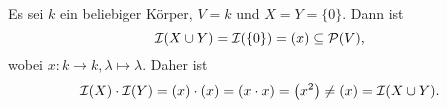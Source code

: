 \documentclass[a4paper,10pt]{article}
\begin{document}
\subsection{}
Es sei $k$ ein beliebiger Körper, $V = k$ und $X = Y = \{0\}$. Dann ist
\[
 \mathcal{I}(X \cup Y) = \mathcal{I}(\{0\}) = (x) \subseteq \mathcal{P}(V),
\]
wobei $x : k \to k, \lambda \mapsto \lambda$. Daher ist
\[
 \mathcal{I}(X) \cdot \mathcal{I}(Y) = (x) \cdot (x) = (x \cdot x) = \left(x^2\right) \neq (x) = \mathcal{I}(X \cup Y).
\]
\end{document}
